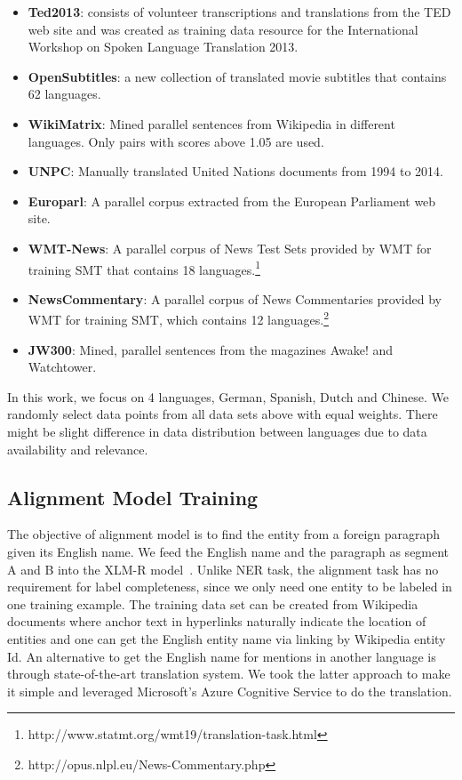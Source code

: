 \documentclass[11pt]{article}
\begin{document}
\begin{itemize}
	\item \textbf{Ted2013}: consists of volunteer transcriptions and translations from the TED web site and was created as training data resource for the International Workshop on Spoken Language Translation 2013.
	\item \textbf{OpenSubtitles}: a new collection of translated movie subtitles that contains 62 languages.~\cite{OpenSubtitles2016}
	\item \textbf{WikiMatrix}: Mined parallel sentences from Wikipedia in different languages. Only pairs with scores above 1.05 are used.~\cite{WikiMatrix}
	\item \textbf{UNPC}: Manually translated United Nations documents from 1994 to 2014.~\cite{UNPC}
	\item \textbf{Europarl}: A parallel corpus extracted from the European Parliament web site.~\cite{Europarl}
	\item \textbf{WMT-News}: A parallel corpus of News Test Sets provided by WMT for training SMT that contains 18 languages.\footnote{http://www.statmt.org/wmt19/translation-task.html}
	\item \textbf{NewsCommentary}: A parallel corpus of News Commentaries provided by WMT for training SMT, which contains 12 languages.\footnote{http://opus.nlpl.eu/News-Commentary.php}
	\item \textbf{JW300}: Mined, parallel sentences from the magazines Awake! and Watchtower.~\cite{jw300}
\end{itemize}

In this work, we focus on 4 languages, German, Spanish, Dutch and Chinese. We randomly select data points from all data sets above with equal weights. There might be slight difference in data distribution between languages due to data availability and relevance.

\subsection{Alignment Model Training}
The objective of alignment model is to find the entity from a foreign paragraph given its English name. We feed the English name and the paragraph as segment A and B into the XLM-R model~\cite{lample2019cross, Conneau2020}. Unlike NER task, the alignment task has no requirement for label completeness, since we only need one entity to be labeled in one training example. The training data set can be created from Wikipedia documents where anchor text in hyperlinks naturally indicate the location of entities and one can get the English entity name via linking by Wikipedia entity Id. An alternative to get the English name for mentions in another language is through state-of-the-art translation system. We took the latter approach to make it simple and leveraged Microsoft's Azure Cognitive Service to do the translation.
\end{document}
